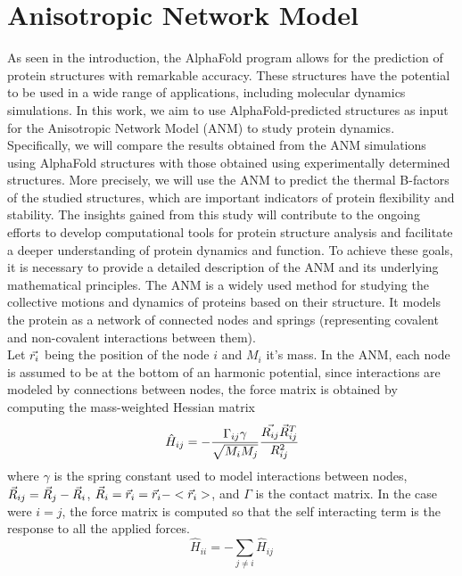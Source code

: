 \section{Anisotropic Network Model}
As seen in the introduction, the AlphaFold program allows for the prediction of protein structures with remarkable accuracy. These structures have the potential to be used in a wide range of applications, including molecular dynamics simulations. In this work, we aim to use AlphaFold-predicted structures as input for the Anisotropic Network Model (ANM) to study protein dynamics. Specifically, we will compare the results obtained from the ANM simulations using AlphaFold structures with those obtained using experimentally determined structures. More precisely, we will use the ANM to predict the thermal B-factors of the studied structures\cite{ANM-COM}, which are important indicators of protein flexibility and stability. The insights gained from this study will contribute to the ongoing efforts to develop computational tools for protein structure analysis and facilitate a deeper understanding of protein dynamics and function. To achieve these goals, it is necessary to provide a detailed description of the ANM and its underlying mathematical principles. The ANM is a widely used method for studying the collective motions and dynamics of proteins based on their structure. It models the protein as a network of connected nodes and springs (representing covalent and non-covalent interactions between them). \\
Let $\vec{r_i}$ being the position of the node $i$ and $M_i$ it's mass. In the ANM, each node is assumed to be at the bottom of an harmonic potential, since interactions are modeled by connections between nodes, the force matrix is obtained by computing the mass-weighted Hessian matrix
\begin{equation}
	\label{mass-weighted hessian matrix}
	\hat{H}_{ij} = -\frac{\Gamma_{ij}\gamma}{\sqrt{M_iM_j}}\cfrac{\vec{R_{ij}}\vec{R}^T_ {ij}}{R^2_ {ij}}
\end{equation}
where $\gamma$ is the spring constant used to model interactions between nodes, $\vec{R}_{ij} = \vec{R}_j - \vec{R}_i$, $\vec{R}_i = \vec{r}_i = \vec{r}_i - <\vec{r}_i>$, and $\Gamma$ is the contact matrix. In the case were $i = j$, the force matrix is computed so that the self interacting term is the response to all the applied forces.
\begin{equation}
	\label{self interacting terms}
	\hat{H}_{ii} = -\sum_{j \ne i}\hat{H}_{ij}
\end{equation}
